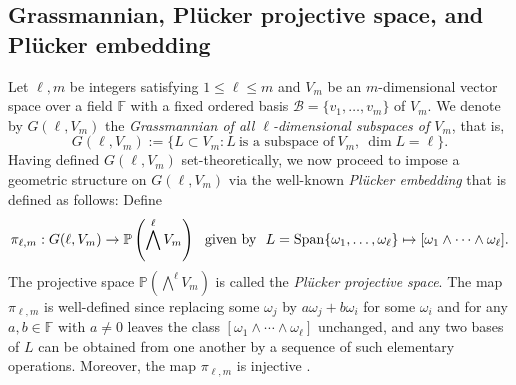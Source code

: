 \documentclass[10pt,a4paper,oneside]{amsproc}
\newcommand{\Fq}{\mathbb{F}_q}
\def\Fq{{\mathbb F}_q}
\def\PP{{\mathbb P}}
\begin{document}
\subsection{Grassmannian, Pl\"ucker projective space, and Pl\"ucker embedding}\label{sec:gra}
Let $\ell, m$ be integers satisfying $1 \le \ell \le m$ and $V_m$ be an $m$-dimensional vector space over a field $\mathbb{F}$ with a fixed ordered basis $\mathcal{B} = \{v_1, \dots, v_m\}$ of $V_m$. 
We denote by $G (\ell, V_m)$ the \emph{Grassmannian of all $\ell$-dimensional subspaces of $V_m$}, that is,
$$G (\ell, V_m) :=\{ L \subset V_m : L \ \text{is a subspace of} \ V_m, \ \dim L = \ell\}.$$
Having defined $G(\ell, V_m)$ set-theoretically, we now proceed to 
impose a geometric structure on $G(\ell, V_m)$ via the well-known \textit{Pl\"{u}cker embedding} that is defined as follows:
Define 
\begin{equation}\label{pl1}
    \pi_{\ell, m} : G(\ell, V_m) \to \PP \left(\bigwedge^\ell V_m\right) \ \ \text{given by} \ \ L = {\rm Span} \{\omega_1, \dots, \omega_\ell\} \mapsto [\omega_1 \wedge \cdots \wedge \omega_\ell].
\end{equation}
 The projective space $\PP \left(\bigwedge^\ell V_m\right)$ is called the \textit{Pl\"ucker projective space}.
 The map $\pi_{\ell,m}$ is well-defined since replacing some $\omega_j$ by $a\omega_j + b\omega_i$ for some $\omega_i$ and for any $a, b \in \mathbb{F}$ with $a \neq 0$ leaves the class 
$[\omega_1 \wedge \cdots \wedge \omega_\ell]$ unchanged, and any 
two bases of $L$ can be obtained from one another by a sequence 
of such elementary operations. Moreover, the map $\pi_{\ell,m}$ 
is injective \cite[Theorem 5.2.1]{LB}.
 
\end{document}
